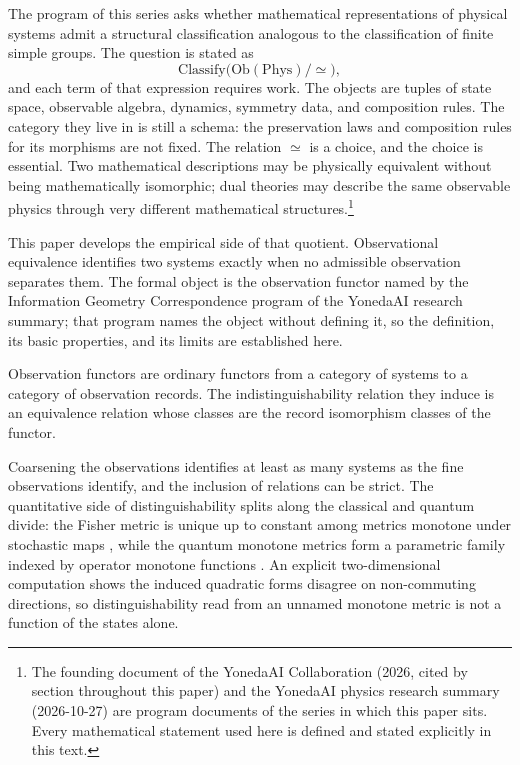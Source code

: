 \documentclass[11pt,letterpaper]{article}
\theoremstyle{definition}
\theoremstyle{remark}
\begin{document}
The program of this series asks whether mathematical representations of physical systems admit a structural classification analogous to the classification of finite simple groups. The question is stated as
\[
\mathrm{Classify}\bigl(\mathrm{Ob}(\mathrm{Phys})/{\simeq}\bigr),
\]
and each term of that expression requires work. The objects are tuples of state space, observable algebra, dynamics, symmetry data, and composition rules. The category they live in is still a schema: the preservation laws and composition rules for its morphisms are not fixed. The relation $\simeq$ is a choice, and the choice is essential. Two mathematical descriptions may be physically equivalent without being mathematically isomorphic; dual theories may describe the same observable physics through very different mathematical structures.\footnote{The founding document of the YonedaAI Collaboration (2026, cited by section throughout this paper) and the YonedaAI physics research summary (2026-10-27) are program documents of the series in which this paper sits. Every mathematical statement used here is defined and stated explicitly in this text.}

This paper develops the empirical side of that quotient. Observational equivalence identifies two systems exactly when no admissible observation separates them. The formal object is the observation functor named by the Information Geometry Correspondence program of the YonedaAI research summary; that program names the object without defining it, so the definition, its basic properties, and its limits are established here.

Observation functors are ordinary functors from a category of systems to a category of observation records. The indistinguishability relation they induce is an equivalence relation whose classes are the record isomorphism classes of the functor.

Coarsening the observations identifies at least as many systems as the fine observations identify, and the inclusion of relations can be strict. The quantitative side of distinguishability splits along the classical and quantum divide: the Fisher metric is unique up to constant among metrics monotone under stochastic maps \cite{b8}, while the quantum monotone metrics form a parametric family indexed by operator monotone functions \cite{b8}. An explicit two-dimensional computation shows the induced quadratic forms disagree on non-commuting directions, so distinguishability read from an unnamed monotone metric is not a function of the states alone.
\end{document}

